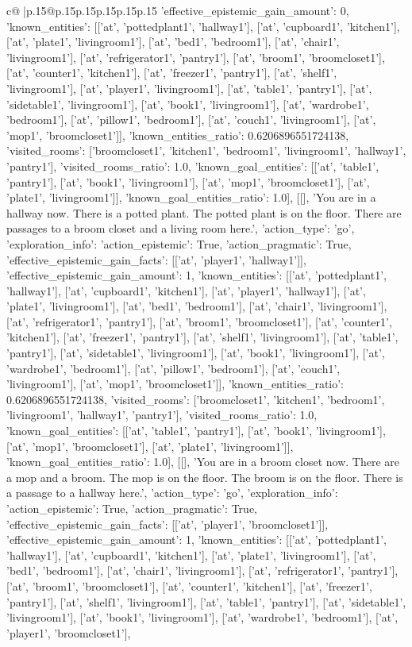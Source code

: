 \documentclass{article}
\begin{document}
{\begin{supertabular}{c@{$\;$}|p{.15\linewidth}@{}p{.15\linewidth}p{.15\linewidth}p{.15\linewidth}p{.15\linewidth}p{.15\linewidth}}
{{{'effective_epistemic_gain_amount': 0, 'known_entities': [['at', 'pottedplant1', 'hallway1'], ['at', 'cupboard1', 'kitchen1'], ['at', 'plate1', 'livingroom1'], ['at', 'bed1', 'bedroom1'], ['at', 'chair1', 'livingroom1'], ['at', 'refrigerator1', 'pantry1'], ['at', 'broom1', 'broomcloset1'], ['at', 'counter1', 'kitchen1'], ['at', 'freezer1', 'pantry1'], ['at', 'shelf1', 'livingroom1'], ['at', 'player1', 'livingroom1'], ['at', 'table1', 'pantry1'], ['at', 'sidetable1', 'livingroom1'], ['at', 'book1', 'livingroom1'], ['at', 'wardrobe1', 'bedroom1'], ['at', 'pillow1', 'bedroom1'], ['at', 'couch1', 'livingroom1'], ['at', 'mop1', 'broomcloset1']], 'known_entities_ratio': 0.6206896551724138, 'visited_rooms': ['broomcloset1', 'kitchen1', 'bedroom1', 'livingroom1', 'hallway1', 'pantry1'], 'visited_rooms_ratio': 1.0, 'known_goal_entities': [['at', 'table1', 'pantry1'], ['at', 'book1', 'livingroom1'], ['at', 'mop1', 'broomcloset1'], ['at', 'plate1', 'livingroom1']], 'known_goal_entities_ratio': 1.0}}], [[], 'You are in a hallway now. There is a potted plant. The potted plant is on the floor. There are passages to a broom closet and a living room here.', {'action_type': 'go', 'exploration_info': {'action_epistemic': True, 'action_pragmatic': True, 'effective_epistemic_gain_facts': [['at', 'player1', 'hallway1']], 'effective_epistemic_gain_amount': 1, 'known_entities': [['at', 'pottedplant1', 'hallway1'], ['at', 'cupboard1', 'kitchen1'], ['at', 'player1', 'hallway1'], ['at', 'plate1', 'livingroom1'], ['at', 'bed1', 'bedroom1'], ['at', 'chair1', 'livingroom1'], ['at', 'refrigerator1', 'pantry1'], ['at', 'broom1', 'broomcloset1'], ['at', 'counter1', 'kitchen1'], ['at', 'freezer1', 'pantry1'], ['at', 'shelf1', 'livingroom1'], ['at', 'table1', 'pantry1'], ['at', 'sidetable1', 'livingroom1'], ['at', 'book1', 'livingroom1'], ['at', 'wardrobe1', 'bedroom1'], ['at', 'pillow1', 'bedroom1'], ['at', 'couch1', 'livingroom1'], ['at', 'mop1', 'broomcloset1']], 'known_entities_ratio': 0.6206896551724138, 'visited_rooms': ['broomcloset1', 'kitchen1', 'bedroom1', 'livingroom1', 'hallway1', 'pantry1'], 'visited_rooms_ratio': 1.0, 'known_goal_entities': [['at', 'table1', 'pantry1'], ['at', 'book1', 'livingroom1'], ['at', 'mop1', 'broomcloset1'], ['at', 'plate1', 'livingroom1']], 'known_goal_entities_ratio': 1.0}}], [[], 'You are in a broom closet now. There are a mop and a broom. The mop is on the floor. The broom is on the floor. There is a passage to a hallway here.', {'action_type': 'go', 'exploration_info': {'action_epistemic': True, 'action_pragmatic': True, 'effective_epistemic_gain_facts': [['at', 'player1', 'broomcloset1']], 'effective_epistemic_gain_amount': 1, 'known_entities': [['at', 'pottedplant1', 'hallway1'], ['at', 'cupboard1', 'kitchen1'], ['at', 'plate1', 'livingroom1'], ['at', 'bed1', 'bedroom1'], ['at', 'chair1', 'livingroom1'], ['at', 'refrigerator1', 'pantry1'], ['at', 'broom1', 'broomcloset1'], ['at', 'counter1', 'kitchen1'], ['at', 'freezer1', 'pantry1'], ['at', 'shelf1', 'livingroom1'], ['at', 'table1', 'pantry1'], ['at', 'sidetable1', 'livingroom1'], ['at', 'book1', 'livingroom1'], ['at', 'wardrobe1', 'bedroom1'], ['at', 'player1', 'broomcloset1'], }}}
\end{supertabular}}
\end{document}
